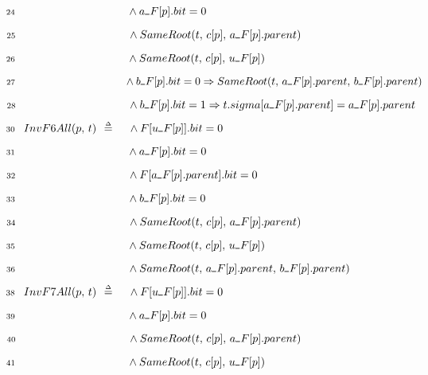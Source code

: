 \documentclass{article}
\makeatletter
\newcommand{\implies}{\Rightarrow}
\newcommand{\defeq}{\;\mathrel{\smash   %
    {{\stackrel{\scriptscriptstyle\Delta}{=}}}}\;}
\renewcommand{\_}{\rule{.4em}{.06em}\hspace{.05em}}
\newif\ifpcalshading \pcalshadingfalse
\newlength{\pcalvspace}\setlength{\pcalvspace}{0pt}%
\newcommand{\@pvspace}[1]{%
  \ifpcalshading
     \par\global\setlength{\pcalvspace}{#1}%
  \else
     \par\vspace{#1}%
  \fi
}
\renewcommand{\.}[1]{\ensuremath{\mbox{}#1\mbox{}}}
\newcommand{\@s}[1]{\hspace{#1pt}}
\newlength{\@xlen}
\newcommand\xtstrut%
  {\setlength{\@xlen}{1.05em}%
   \addtolength{\@xlen}{\pcalvspace}%
    \raisebox{\vshadelen}{\raisebox{-.25em}{\rule{0pt}{\@xlen}}}%
   \global\setlength{\vshadelen}{0pt}%
   \global\setlength{\pcalvspace}{0pt}}
\newcommand{\@x}[1]{\par
  \ifpcalshading
  \makebox[0pt][l]{\shadebox{\xtstrut\hspace*{\textwidth}}}%
  \fi
  \mbox{$\mbox{}#1\mbox{}$}}
\def\graymargin{1}
\newlength{\templena}
\newlength{\templenb}
\newcommand{\shadebox}[1]{{\setlength{\fboxsep}{\graymargin pt}%
     \savebox{\tempboxa}{#1}%
     \settoheight{\templena}{\usebox{\tempboxa}}%
     \settodepth{\templenb}{\usebox{\tempboxa}}%
     \hspace*{-\fboxsep}\raisebox{0pt}[\templena][\templenb]%
        {\colorbox{boxshade}{\usebox{\tempboxa}}}\hspace*{-\fboxsep}}}
\newlength{\vshadelen}
\makeatother
\begin{document}
 \@x{\makebox[0pt][r]{\scriptsize 24\hspace{1em}}\@s{92.97} \.{\land} a\_F [ p
 ] . bit \.{=} 0}%
 \@x{\makebox[0pt][r]{\scriptsize 25\hspace{1em}}\@s{92.97} \.{\land} SameRoot
 ( t ,\, c [ p ] ,\, a\_F [ p ] . parent )}%
 \@x{\makebox[0pt][r]{\scriptsize 26\hspace{1em}}\@s{92.97} \.{\land} SameRoot
 ( t ,\, c [ p ] ,\, u\_F [ p ] )}%
 \@x{\makebox[0pt][r]{\scriptsize 27\hspace{1em}}\@s{92.97} \.{\land} b\_F [ p
 ] . bit \.{=} 0 \.{\implies} SameRoot ( t ,\, a\_F [ p ] . parent ,\, b\_F [
 p ] . parent )}%
 \@x{\makebox[0pt][r]{\scriptsize 28\hspace{1em}}\@s{92.97} \.{\land} b\_F [ p
 ] . bit \.{=} 1 \.{\implies} t . sigma [ a\_F [ p ] . parent ] \.{=} a\_F [
 p ] . parent}%
\@pvspace{8.0pt}%
 \@x{\makebox[0pt][r]{\scriptsize 30\hspace{1em}} InvF6All ( p ,\, t
 )\@s{1.21} \.{\defeq}\@s{8.2} \.{\land} F [ u\_F [ p ] ] . bit \.{=} 0}%
 \@x{\makebox[0pt][r]{\scriptsize 31\hspace{1em}}\@s{92.97} \.{\land} a\_F [ p
 ] . bit \.{=} 0}%
 \@x{\makebox[0pt][r]{\scriptsize 32\hspace{1em}}\@s{92.97} \.{\land} F [ a\_F
 [ p ] . parent ] . bit \.{=} 0}%
 \@x{\makebox[0pt][r]{\scriptsize 33\hspace{1em}}\@s{92.97} \.{\land} b\_F [ p
 ] . bit \.{=} 0}%
 \@x{\makebox[0pt][r]{\scriptsize 34\hspace{1em}}\@s{92.97} \.{\land} SameRoot
 ( t ,\, c [ p ] ,\, a\_F [ p ] . parent )}%
 \@x{\makebox[0pt][r]{\scriptsize 35\hspace{1em}}\@s{92.97} \.{\land} SameRoot
 ( t ,\, c [ p ] ,\, u\_F [ p ] )}%
 \@x{\makebox[0pt][r]{\scriptsize 36\hspace{1em}}\@s{92.97} \.{\land} SameRoot
 ( t ,\, a\_F [ p ] . parent ,\, b\_F [ p ] . parent )}%
\@pvspace{8.0pt}%
 \@x{\makebox[0pt][r]{\scriptsize 38\hspace{1em}} InvF7All ( p ,\, t
 )\@s{1.21} \.{\defeq}\@s{8.2} \.{\land} F [ u\_F [ p ] ] . bit \.{=} 0}%
 \@x{\makebox[0pt][r]{\scriptsize 39\hspace{1em}}\@s{92.97} \.{\land} a\_F [ p
 ] . bit \.{=} 0}%
 \@x{\makebox[0pt][r]{\scriptsize 40\hspace{1em}}\@s{92.97} \.{\land} SameRoot
 ( t ,\, c [ p ] ,\, a\_F [ p ] . parent )}%
 \@x{\makebox[0pt][r]{\scriptsize 41\hspace{1em}}\@s{92.97} \.{\land} SameRoot
 ( t ,\, c [ p ] ,\, u\_F [ p ] )}%
\end{document}
